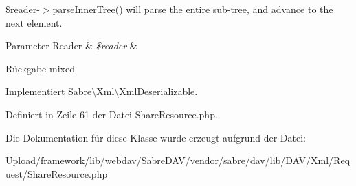\$reader-\/$>$parse\+Inner\+Tree() will parse the entire sub-\/tree, and advance to the next element.


\begin{DoxyParams}[1]{Parameter}
Reader & {\em \$reader} & \\
\hline
\end{DoxyParams}
\begin{DoxyReturn}{Rückgabe}
mixed 
\end{DoxyReturn}


Implementiert \mbox{\hyperlink{interface_sabre_1_1_xml_1_1_xml_deserializable_a19e0eca545b9a0d93f7d6b69085ade30}{Sabre\textbackslash{}\+Xml\textbackslash{}\+Xml\+Deserializable}}.



Definiert in Zeile 61 der Datei Share\+Resource.\+php.



Die Dokumentation für diese Klasse wurde erzeugt aufgrund der Datei\+:\begin{DoxyCompactItemize}
\item 
Upload/framework/lib/webdav/\+Sabre\+D\+A\+V/vendor/sabre/dav/lib/\+D\+A\+V/\+Xml/\+Request/Share\+Resource.\+php\end{DoxyCompactItemize}
